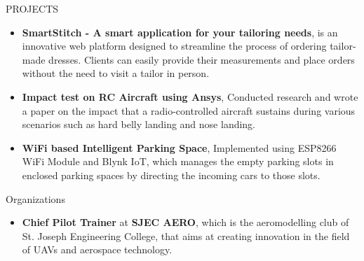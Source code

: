\documentclass{resume} %
\begin{document}
\begin{rSection}{PROJECTS}
\begin{itemize}


\item \textbf{SmartStitch - A smart application for your tailoring needs}{, is an innovative web platform designed to streamline the process of ordering tailor-made dresses. Clients can easily provide their measurements and place orders without the need to visit a tailor in person.}
\item \textbf{Impact test on RC Aircraft using Ansys}{, Conducted research and wrote a paper on the impact that a radio-controlled aircraft sustains during
various scenarios such as hard belly landing and nose landing.}

\item \textbf{WiFi based Intelligent Parking Space}{, Implemented using ESP8266 WiFi Module and Blynk IoT, which manages the empty parking slots in enclosed parking spaces by directing the incoming cars to those slots.}
\end{itemize}

\end{rSection}


\begin{rSection}{Organizations} 
    \begin{itemize}
        \item 	\textbf{Chief Pilot Trainer} at \textbf{SJEC AERO}, which is the aeromodelling club of St. Joseph Engineering College, that aims at creating innovation in the field of UAVs and aerospace technology.
        
        
    
    \end{itemize}
    
    
\end{rSection}
\end{document}
